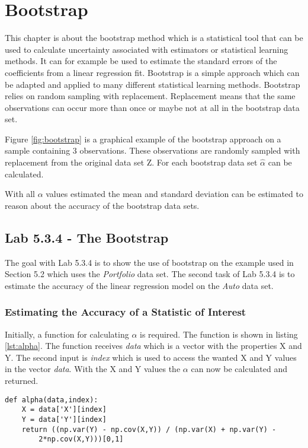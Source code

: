 \section{Bootstrap}
This chapter is about the bootstrap method which is a statistical tool that can be used to calculate uncertainty associated with estimators or statistical learning methods. It can for example be used to estimate the standard errors of the coefficients from a linear regression fit. Bootstrap is a simple approach which can be adapted and applied to many different statistical learning methods. Bootstrap relies on random sampling with replacement. Replacement means that the same observations can occur more than once or maybe not at all in the bootstrap data set. 


Figure \ref{fig:bootstrap} is a graphical example of the bootstrap approach on a sample containing 3 observations. These observations are randomly sampled with replacement from the original data set Z. For each bootstrap data set $\hat{\alpha}$ can be calculated.

With all $\alpha$ values estimated the mean and standard deviation can be estimated to reason about the accuracy of the bootstrap data sets.

\subsection{Lab 5.3.4 - The Bootstrap}

The goal with Lab 5.3.4 is to show the use of bootstrap on the example used in Section 5.2 \citep[pp. 187-190]{ISLR} which uses the \emph{Portfolio} data set. The second task of Lab 5.3.4 is to estimate the accuracy of the linear regression model on the \emph{Auto} data set.

\subsubsection{Estimating the Accuracy of a Statistic of Interest}

Initially, a function for calculating $\alpha$ is required. The function is shown in listing \ref{lst:alpha}. The function receives \emph{data} which is a vector with the properties X and Y. The second input is \emph{index} which is used to access the wanted X and Y values in the vector \emph{data}.
With the X and Y values the $\alpha$ can now be calculated and returned.
\newpage
\begin{lstlisting}[caption={Function for calculating $\alpha$ in python}, label=lst:alpha, mathescape=true]
def alpha(data,index):
	X = data['X'][index]
	Y = data['Y'][index]
	return ((np.var(Y) - np.cov(X,Y)) / (np.var(X) + np.var(Y) - 
		2*np.cov(X,Y)))[0,1]
\end{lstlisting}


